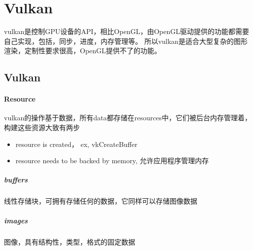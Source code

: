 \clearpage
\part{Vulkan}

vulkan是控制GPU设备的API，相比OpenGL，由OpenGL驱动提供的功能都需要自己实现，包括，同步，进度，内存管理等。
所以vulkan是适合大型复杂的图形渲染，定制性要求很高，OpenGL提供不了的功能。

\chapter{Vulkan}

\subsection{Resource}

vulkan的操作基于数据，所有data都存储在resources中，它们被后台内存管理着，构建这些资源大致有两步
\begin{itemize}
    \item {resource is created， ex, vkCreateBuffer}
    \item {resource needs to be backed by memory, 允许应用程序管理内存}
\end{itemize}

\subsubsection{buffers}

线性存储块，可拥有存储任何的数据，它同样可以存储图像数据

\subsubsection{images}

图像，具有结构性，类型，格式的固定数据